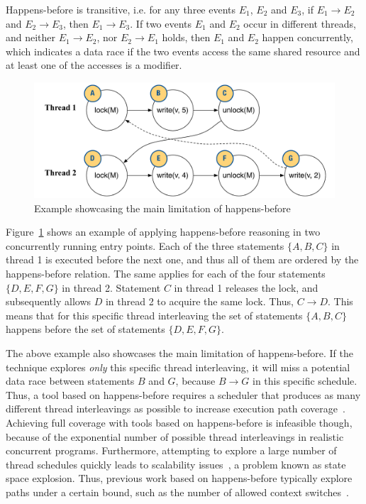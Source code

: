 Happens-before is transitive, i.e. for any three events $E_1$, $E_2$ and $E_3$, if $E_1 \rightarrow E_2$ and $E_2 \rightarrow E_3$, then $E_1 \rightarrow E_3$. If two events $E_1$ and $E_2$ occur in different threads, and neither $E_1 \rightarrow E_2$, nor $E_2 \rightarrow E_1$ holds, then $E_1$ and $E_2$ happen concurrently, which indicates a data race if the two events access the same shared resource and at least one of the accesses is a modifier.

\begin{figure}[htbp]
\centering
\includegraphics[width=1\linewidth]{img/happens_before.pdf}
\caption{Example showcasing the main limitation of happens-before}
\label{fig:happens_before}
\end{figure}

Figure~\ref{fig:happens_before} shows an example of applying happens-before reasoning in two concurrently running entry points. Each of the three statements $\{A, B, C\}$ in thread 1 is executed before the next one, and thus all of them are ordered by the happens-before relation. The same applies for each of the four statements $\{D, E, F, G\}$ in thread 2. Statement $C$ in thread 1 releases the lock, and subsequently allows $D$ in thread 2 to acquire the same lock. Thus, $C \rightarrow D$. This means that for this specific thread interleaving the set of statements $\{A, B, C\}$ happens before the set of statements $\{D, E, F, G\}$.

The above example also showcases the main limitation of happens-before. If the technique explores \emph{only} this specific thread interleaving, it will miss a potential data race between statements $B$ and $G$, because $B \rightarrow G$ in this specific schedule. Thus, a tool based on happens-before requires a scheduler that produces as many different thread interleavings as possible to increase execution path coverage~\cite{savage1997eraser}. Achieving full coverage with tools based on happens-before is infeasible though, because of the exponential number of possible thread interleavings in realistic concurrent programs. Furthermore, attempting to explore a large number of thread schedules quickly leads to scalability issues~\cite{musuvathi2008finding}, a problem known as state space explosion. Thus, previous work based on happens-before typically explore paths under a certain bound, such as the number of allowed context switches~\cite{qadeer2004kiss}.

